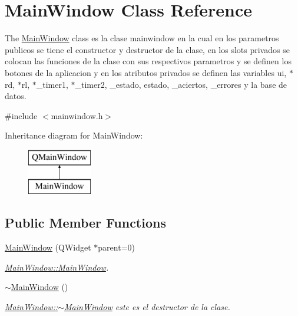 \hypertarget{class_main_window}{}\section{Main\+Window Class Reference}
\label{class_main_window}


The \hyperlink{class_main_window}{Main\+Window} class es la clase mainwindow en la cual en los parametros publicos se tiene el constructor y destructor de la clase, en los slots privados se colocan las funciones de la clase con sus respectivos parametros y se definen los botones de la aplicacion y en los atributos privados se definen las variables ui, $\ast$rd, $\ast$rl, $\ast$\+\_\+timer1, $\ast$\+\_\+timer2, \+\_\+estado, estado, \+\_\+aciertos, \+\_\+errores y la base de datos.  




{\ttfamily \#include $<$mainwindow.\+h$>$}

Inheritance diagram for Main\+Window\+:\begin{figure}[H]
\begin{center}
\leavevmode
\includegraphics[height=2.000000cm]{class_main_window}
\end{center}
\end{figure}
\subsection*{Public Member Functions}
\begin{DoxyCompactItemize}
\item 
\hyperlink{class_main_window_a8b244be8b7b7db1b08de2a2acb9409db}{Main\+Window} (Q\+Widget $\ast$parent=0)
\begin{DoxyCompactList}\small\item\em \hyperlink{class_main_window_a8b244be8b7b7db1b08de2a2acb9409db}{Main\+Window\+::\+Main\+Window}. \end{DoxyCompactList}\item 
\hyperlink{class_main_window_ae98d00a93bc118200eeef9f9bba1dba7}{$\sim$\+Main\+Window} ()
\begin{DoxyCompactList}\small\item\em \hyperlink{class_main_window_ae98d00a93bc118200eeef9f9bba1dba7}{Main\+Window\+::$\sim$\+Main\+Window} este es el destructor de la clase. \end{DoxyCompactList}\end{DoxyCompactItemize}


